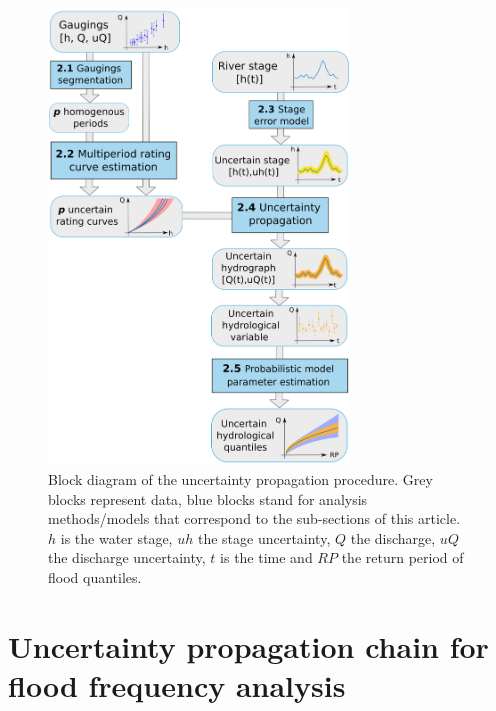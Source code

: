 \documentclass[11pt]{article}
\begin{document}
    \begin{figure}[h!]
    \centering
        \includegraphics[width = 8cm]{Figs/1-uTotSchema.png}
        \caption{Block diagram of the uncertainty propagation procedure. Grey blocks represent data, blue blocks stand for analysis methods/models that correspond to the sub-sections of this article. $h$ is the water stage, $uh$ the stage uncertainty, $Q$ the discharge, $uQ$ the discharge uncertainty, $t$ is the time and $RP$ the return period of flood quantiles.}
        \label{fig:ChProp}
    \end{figure}


\section{Uncertainty propagation chain for flood frequency analysis}
    
    
\end{document}
